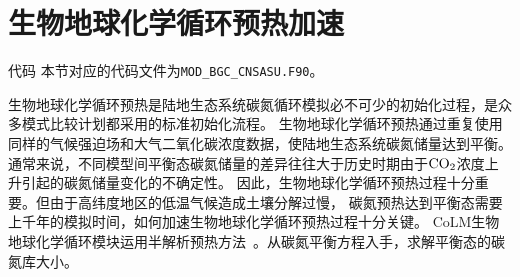 \chapter{生物地球化学循环预热加速}\label{生物地球化学循环预热加速}
\begin{mymdframed}{代码}
本节对应的代码文件为\texttt{MOD\_BGC\_CNSASU.F90}。
\end{mymdframed}
生物地球化学循环预热是陆地生态系统碳氮循环模拟必不可少的初始化过程，是众多模式比较计划都采用的标准初始化流程。
生物地球化学循环预热通过重复使用同样的气候强迫场和大气二氧化碳浓度数据，使陆地生态系统碳氮储量达到平衡。
通常来说，不同模型间平衡态碳氮储量的差异往往大于历史时期由于$\rm CO_2$浓度上升引起的碳氮储量变化的不确定性。
因此，生物地球化学循环预热过程十分重要。但由于高纬度地区的低温气候造成土壤分解过慢，
碳氮预热达到平衡态需要上千年的模拟时间，如何加速生物地球化学循环预热过程十分关键。
CoLM生物地球化学循环模块运用半解析预热方法~\citep{xia2012semi}。从碳氮平衡方程入手，求解平衡态的碳氮库大小。


